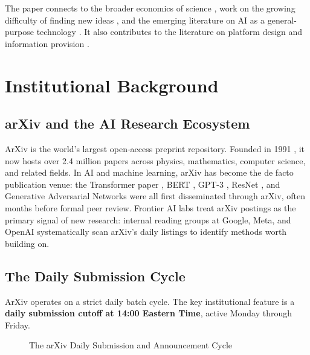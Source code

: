 \documentclass[12pt]{article}
\begin{document}
The paper connects to the broader economics of science \citep{stephan1996, fortunato2018}, work on the growing difficulty of finding new ideas \citep{jones2009, bloom2020}, and the emerging literature on AI as a general-purpose technology \citep{cockburn2019, goldfarb2023}. It also contributes to the literature on platform design and information provision \citep{nagaraj2020, biasi2021}.


\section{Institutional Background}

\subsection{arXiv and the AI Research Ecosystem}

ArXiv is the world's largest open-access preprint repository. Founded in 1991 \citep{ginsparg2011}, it now hosts over 2.4 million papers across physics, mathematics, computer science, and related fields. In AI and machine learning, arXiv has become the de facto publication venue: the Transformer paper \citep{vaswani2017}, BERT \citep{devlin2019}, GPT-3 \citep{brown2020}, ResNet \citep{he2016}, and Generative Adversarial Networks \citep{goodfellow2014} were all first disseminated through arXiv, often months before formal peer review. Frontier AI labs treat arXiv postings as the primary signal of new research: internal reading groups at Google, Meta, and OpenAI systematically scan arXiv's daily listings to identify methods worth building on.

\subsection{The Daily Submission Cycle}

ArXiv operates on a strict daily batch cycle. The key institutional feature is a \textbf{daily submission cutoff at 14:00 Eastern Time}, active Monday through Friday.

\begin{figure}[H]
\centering
{}
\caption{The arXiv Daily Submission and Announcement Cycle}
\label{fig:timeline}
\end{figure}
\end{document}
